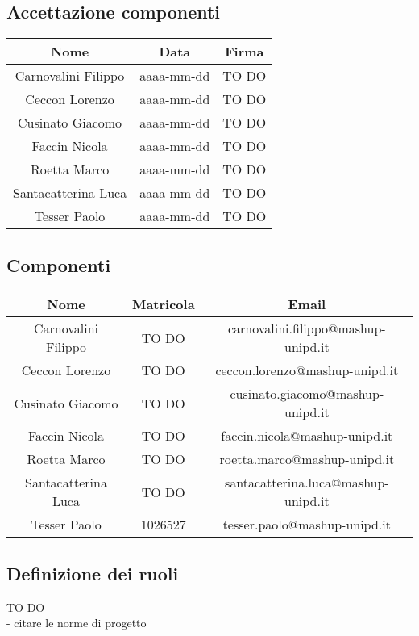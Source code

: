 	\subsection{Accettazione componenti} %
	\label{sub:accettazione_componenti}
		\begin{longtable}{c|c|c}
			\label{tab:accettazione_componenti}
			\textbf{Nome} & \textbf{Data} & \textbf{Firma} \\
			\hline
			Carnovalini Filippo &
			aaaa-mm-dd &
			TO DO \\
			\hline
			
			Ceccon Lorenzo &
			aaaa-mm-dd &
			TO DO \\
			\hline
			
			Cusinato Giacomo &
			aaaa-mm-dd &
			TO DO \\
			\hline
			
			Faccin Nicola &
			aaaa-mm-dd &
			TO DO \\
			\hline
			
			Roetta Marco &
			aaaa-mm-dd &
			TO DO \\
			\hline
			
			Santacatterina Luca &
			aaaa-mm-dd &
			TO DO \\
			\hline
			
			Tesser Paolo &
			aaaa-mm-dd &
			TO DO
		\end{longtable}
	
	\subsection{Componenti} %
	\label{sub:componenti}
		\begin{longtable}{c|c|c}
			\label{tab:componenti}
			\textbf{Nome} & \textbf{Matricola} & \textbf{Email} \\
			\hline
			Carnovalini Filippo &
			TO DO &
			carnovalini.filippo@mashup-unipd.it  \\
			\hline
			
			Ceccon Lorenzo &
			TO DO &
			ceccon.lorenzo@mashup-unipd.it \\
			\hline
			
			Cusinato Giacomo &
			TO DO &
			cusinato.giacomo@mashup-unipd.it \\
			\hline
			
			Faccin Nicola &
			TO DO &
			faccin.nicola@mashup-unipd.it \\
			\hline
			
			Roetta Marco &
			TO DO &
			roetta.marco@mashup-unipd.it \\
			\hline
			
			Santacatterina Luca &
			TO DO &
			santacatterina.luca@mashup-unipd.it \\
			\hline
			
			Tesser Paolo &
			1026527 &
			tesser.paolo@mashup-unipd.it
		\end{longtable}

	\subsection{Definizione dei ruoli} %
	\label{sub:definizione_dei_ruoli}
	TO DO \\
	- citare le norme di progetto \\

